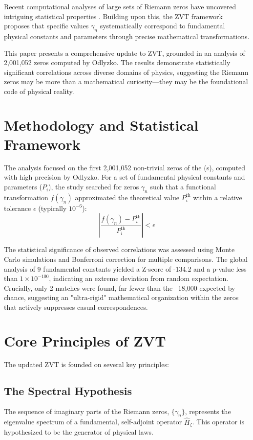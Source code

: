 \documentclass[12pt, twocolumn, reprint, amsmath, amssymb, aps]{revtex4-2}
\newcommand{\zetafunction}{\zeta(s)}
\newcommand{\riemannzeros}{\{\gamma_n\}}
\newcommand{\hamiltonian}{\hat{H}_{\zeta}}
\begin{document}
Recent computational analyses of large sets of Riemann zeros have uncovered intriguing statistical properties \cite{odlyzko1987, bogomolny1995}. Building upon this, the ZVT framework proposes that specific values $\gamma_n$ systematically correspond to fundamental physical constants and parameters through precise mathematical transformations.

This paper presents a comprehensive update to ZVT, grounded in an analysis of 2,001,052 zeros computed by Odlyzko. The results demonstrate statistically significant correlations across diverse domains of physics, suggesting the Riemann zeros may be more than a mathematical curiosity—they may be the foundational code of physical reality.

\section{Methodology and Statistical Framework}
\label{sec:methods}
The analysis focused on the first 2,001,052 non-trivial zeros of the \zetafunction, computed with high precision by Odlyzko. For a set of fundamental physical constants and parameters ($P_i$), the study searched for zeros $\gamma_n$ such that a functional transformation $f(\gamma_n)$ approximated the theoretical value $P_i^{\text{th}}$ within a relative tolerance $\epsilon$ (typically $10^{-6}$):
\begin{equation}
    \left| \frac{f(\gamma_n) - P_i^{\text{th}}}{P_i^{\text{th}}} \right| < \epsilon
\end{equation}

The statistical significance of observed correlations was assessed using Monte Carlo simulations and Bonferroni correction for multiple comparisons. The global analysis of 9 fundamental constants yielded a Z-score of -134.2 and a p-value less than $1 \times 10^{-100}$, indicating an extreme deviation from random expectation. Crucially, only 2 matches were found, far fewer than the ~18,000 expected by chance, suggesting an "ultra-rigid" mathematical organization within the zeros that actively suppresses casual correspondences.

\section{Core Principles of ZVT}
\label{sec:principles}
The updated ZVT is founded on several key principles:

\subsection{The Spectral Hypothesis}
\label{sec:spectral}
The sequence of imaginary parts of the Riemann zeros, $\riemannzeros$, represents the eigenvalue spectrum of a fundamental, self-adjoint operator $\hamiltonian$. This operator is hypothesized to be the generator of physical laws.
\end{document}
